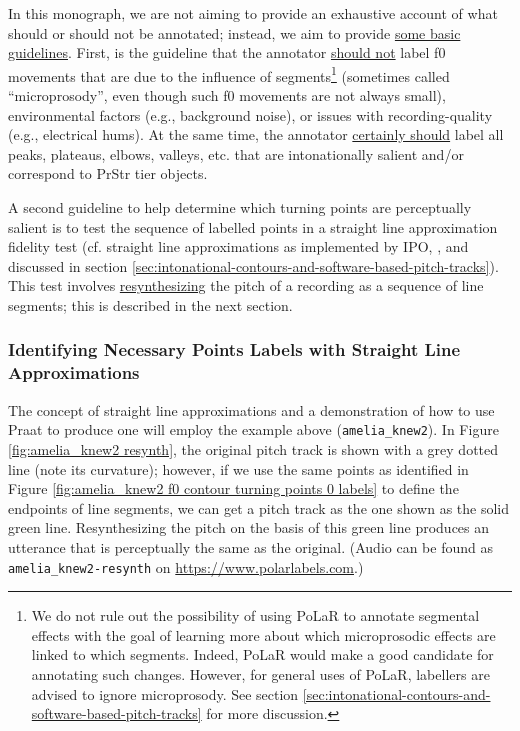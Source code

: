 \documentclass[11pt, twoside]{memoir}
\begin{document}
In this monograph, we are not aiming to provide an exhaustive account of what should or should not be annotated; instead, we aim to provide \uline{some basic guidelines}. First, is the guideline that the annotator \uline{should not} label f0 movements that are due to the influence of segments\footnote{We do not rule out the possibility of using PoLaR to annotate segmental effects with the goal of learning more about which microprosodic effects are linked to which segments. Indeed, PoLaR would make a good candidate for annotating such changes. However, for general uses of PoLaR, labellers are advised to ignore microprosody. See section \ref{sec:intonational-contours-and-software-based-pitch-tracks} for more discussion.} (sometimes called “microprosody”, even though such f0 movements are not always small), environmental factors (e.g., background noise), or issues with recording-quality (e.g., electrical hums). At the same time, the annotator \uline{certainly should} label all peaks, plateaus, elbows, valleys, etc. that are intonationally salient and/or correspond to PrStr tier objects.

A second guideline to help determine which turning points are perceptually salient is to test the sequence of labelled points in a straight line approximation fidelity test (cf. straight line approximations as implemented by IPO, \citealt{t-hart-90}, and discussed in section \ref{sec:intonational-contours-and-software-based-pitch-tracks}). This test involves \uline{resynthesizing} the pitch of a recording as a sequence of line segments; this is described in the next section.

\subsubsection{Identifying Necessary Points Labels with Straight Line Approximations}\label{sec:identifying-necessary-points-labels-with-straight-line-approximations}

The concept of straight line approximations and a demonstration of how to use Praat to produce one will employ the example above (\texttt{amelia\_knew2}). In Figure \ref{fig:amelia_knew2 resynth}, the original pitch track is shown with a grey dotted line (note its curvature); however, if we use the same points as identified in Figure \ref{fig:amelia_knew2 f0 contour turning points 0 labels} to define the endpoints of line segments, we can get a pitch track as the one shown as the solid green line. Resynthesizing the pitch on the basis of this green line produces an utterance that is perceptually the same as the original. (Audio can be found as \texttt{amelia\_knew2-resynth} on \url{https://www.polarlabels.com}.)
\end{document}
